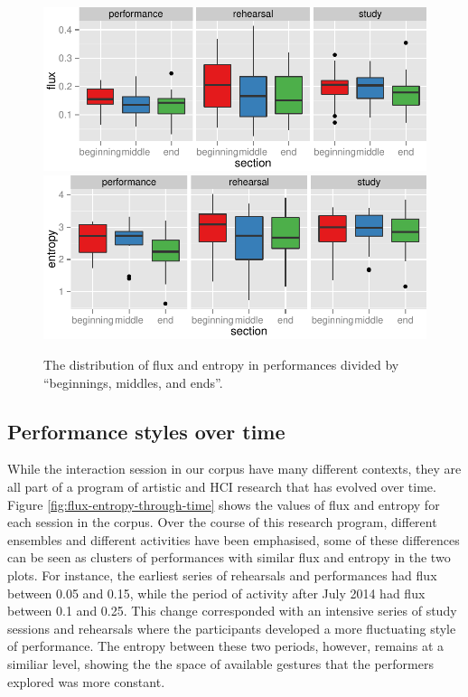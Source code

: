 \documentclass{sigchi}
\begin{document}
\begin{figure}
  \centering
  \includegraphics[width=\linewidth]{figures/context-section-flux}
  \includegraphics[width=\linewidth]{figures/context-section-entropy}
  \caption{The distribution of flux and entropy in performances divided by ``beginnings,
    middles, and ends''.
    \label{fig:context-section-flux-entropy}}
\end{figure}



\subsection{Performance styles over time}

While the interaction session in our corpus have many different
contexts, they are all part of a program of artistic and HCI research
that has evolved over time. Figure \ref{fig:flux-entropy-through-time}
shows the values of flux and entropy for each session in the corpus.
Over the course of this research program, different ensembles and
different activities have been emphasised, some of these differences
can be seen as clusters of performances with similar flux and entropy
in the two plots. For instance, the earliest series of rehearsals and
performances had flux between 0.05 and 0.15, while the period of
activity after July 2014 had flux between 0.1 and 0.25. This change
corresponded with an intensive series of study sessions and rehearsals
where the participants developed a more fluctuating style of
performance. The entropy between these two periods, however, remains
at a similiar level, showing the the space of available gestures that
the performers explored was more constant.
\end{document}
